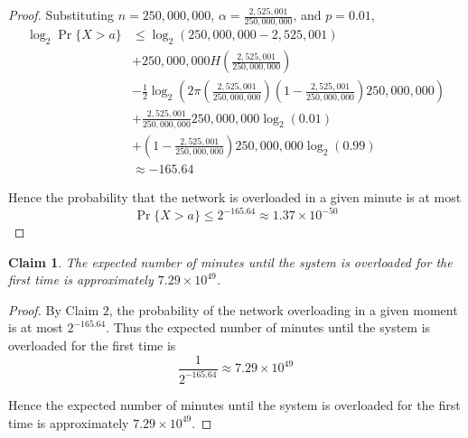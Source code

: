 \documentclass{article}
\newtheorem{claim}{Claim}
\begin{document}
\begin{proof}
    Substituting $n = 250{,}000{,}000$, $\alpha = \frac{2{,}525{,}001}{250{,}000{,}000}$, and $p = 0.01$,
    \[
    \begin{aligned}
    \log_2\Pr\{X > a\} &\leq \log_2\left(250{,}000{,}000-2{,}525{,}001\right) \\
    &+250{,}000{,}000H\left(\frac{2{,}525{,}001}{250{,}000{,}000}\right) \\
    &-\frac{1}{2}\log_2\left(2\pi\left(\frac{2{,}525{,}001}{250{,}000{,}000}\right)
    \left(1-\frac{2{,}525{,}001}{250{,}000{,}000}\right)250{,}000{,}000\right) \\
    &+\frac{2{,}525{,}001}{250{,}000{,}000}250{,}000{,}000\log_2(0.01) \\
    &+ \left(1-\frac{2{,}525{,}001}{250{,}000{,}000}\right)250{,}000{,}000\log_2(0.99) \\
    &\approx -165.64
    \end{aligned}
    \]

    \medskip

    Hence the probability that the network is overloaded in a given minute is at most
    \[
    \Pr\{X > a\} \leq 2^{-165.64} \approx 1.37 \times 10^{-50}
    \]
\end{proof}

\begin{claim}
    The expected number of minutes until the system is overloaded for the first time is approximately 
    $7.29 \times 10^{49}$.
\end{claim}

\begin{proof}
    By Claim $2$, the probability of the network overloading in a given moment is at most $2^{-165.64}$. 
    Thus the expected number of minutes until the system is overloaded for the first time is 
    \[
    \frac{1}{2^{-165.64}} \approx 7.29 \times 10^{49}
    \]

    \medskip

    Hence the expected number of minutes until the system is overloaded for the first time is approximately
    $7.29 \times 10^{49}$.
\end{proof}
\end{document}
